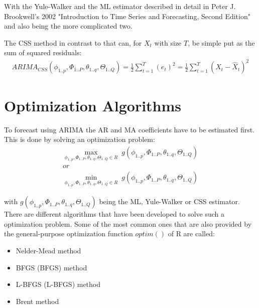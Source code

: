With the Yule-Walker and the \acl{ML} estimator described in detail in Peter J. Brookwell's 2002 "Introduction to Time Series and Forecasting, Second Edition" and also being the more complicated two.

The \acl{CSS} method in contrast to that can, for $X_t$ with size $T$, be simple put as the sum of squared residuals:
\begin{equation}\label{eq:ARIMA_CSS}
\begin{array}{rcl}
ARIMA_{CSS}(\phi_{1..p}, \Phi_{1..P}, \theta_{1..q}, \Theta_{1..Q}) = \frac{1}{2}\displaystyle\sum_{t=1}^{T} (e_t)^2 = \frac{1}{2}\displaystyle\sum_{t=1}^{T} (X_t - \hat{X}_t)^2
\end{array}
\end{equation}


\section{Optimization Algorithms}\label{optimalgorithms}
To forecast using \acs{ARIMA} the \acl{AR} and \acl{MA} coefficients have to be estimated first. This is done by solving an optimization problem:
\begin{equation}\label{eq:min}
\begin{array}{c}
\displaystyle\max_{\phi_{1..p}, \Phi_{1..P}, \theta_{1..q}, \Theta_{1..Q} \in R} \; g(\phi_{1..p}, \Phi_{1..P}, \theta_{1..q}, \Theta_{1..Q})\\
or \\
\displaystyle\min_{\phi_{1..p}, \Phi_{1..P}, \theta_{1..q}, \Theta_{1..Q} \in R} \; g(\phi_{1..p}, \Phi_{1..P}, \theta_{1..q}, \Theta_{1..Q})
\end{array}
\end{equation}

with $g(\phi_{1..p}, \Phi_{1..P}, \theta_{1..q}, \Theta_{1..Q})$ being the \acl{ML}, Yule-Walker or \acl{CSS} estimator. There are different algorithms that have been developed to solve such a optimization problem. Some of the most common ones that are also provided by the general-purpose optimization function $optim()$  of R are called:
\begin{itemize}
	\item Nelder-Mead method
	\item \acl{BFGS} (\acs{BFGS}) method
	\item \acl{L-BFGS} (\acs{L-BFGS}) method
	\item Brent method
\end{itemize}

